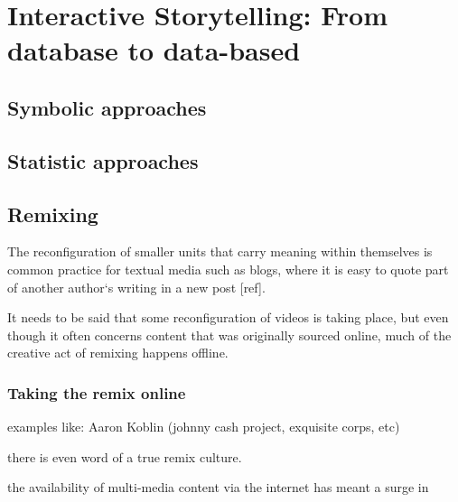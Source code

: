 \chapter{Interactive Storytelling: From database to data-based}
\label{ch:storytelling}
\section{Symbolic approaches}
\label{sec:symbolic}
\section{Statistic approaches}
\label{sec:statistic}

\section{Remixing}

The reconfiguration of smaller units that carry meaning within themselves is common practice for textual media such as blogs, where it is easy to quote part of  another author`s writing in a new post [ref]. 

It needs to be said that some reconfiguration of videos is taking place, but even though it often concerns content that was originally sourced online, much of the creative act of remixing happens offline.


\subsection{Taking the remix online}

examples like: Aaron Koblin (johnny cash project, exquisite corps, etc)

there is even word of a true remix culture.

the availability of multi-media content via the internet has meant a surge in 
